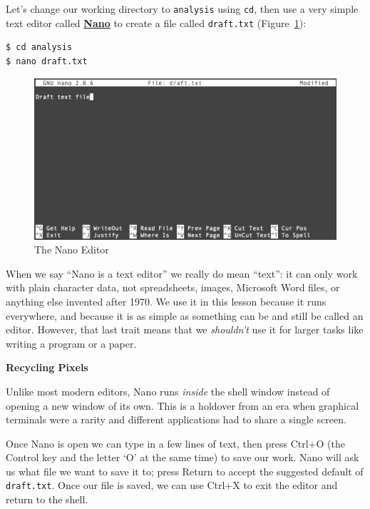 \documentclass[
]{krantz}
\renewenvironment{quote}{\begin{VF}}{\end{VF}}
\newcommand{\gref}[2]{\hyperlink{#2}{\textbf{#1}}}
\begin{document}
Let's change our working directory to \texttt{analysis} using \texttt{cd},
then use a very simple text editor called \gref{Nano}{nano\_editor} to create a file called \texttt{draft.txt}
(Figure~\ref{fig:bash-basics-nano}):

\begin{verbatim}
$ cd analysis
$ nano draft.txt
\end{verbatim}

\begin{figure}

{\centering \includegraphics[width=1\linewidth]{figures/bash-basics/nano-editor} 

}

\caption{The Nano Editor}\label{fig:bash-basics-nano}
\end{figure}

When we say ``Nano is a text editor'' we really do mean ``text'':
it can only work with plain character data,
not spreadsheets, images, Microsoft Word files, or anything else invented after 1970.
We use it in this lesson because it runs everywhere,
and because it is as simple as something can be and still be called an editor.
However,
that last trait means that we \emph{shouldn't} use it for larger tasks
like writing a program or a paper.

\begin{quote}
\textbf{Recycling Pixels}

Unlike most modern editors,
Nano runs \emph{inside} the shell window instead of opening a new window of its own.
This is a holdover from an era when graphical terminals were a rarity
and different applications had to share a single screen.
\end{quote}

Once Nano is open we can type in a few lines of text,
then press Ctrl+O
(the Control key and the letter `O' at the same time)
to save our work.
Nano will ask us what file we want to save it to;
press Return to accept the suggested default of \texttt{draft.txt}.
Once our file is saved,
we can use Ctrl+X to exit the editor and return to the shell.
\end{document}
